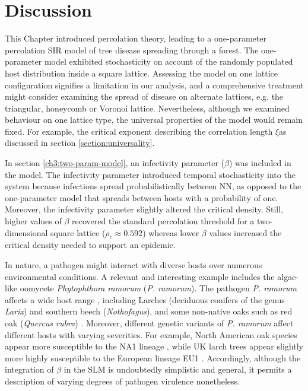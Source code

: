 \newpage

\section{Discussion}

This Chapter introduced percolation theory, leading to a one-parameter percolation SIR model of tree disease spreading through a forest.
The one-parameter model exhibited stochasticity on account of the randomly populated host distribution inside a square lattice. 
Assessing the model on one lattice configuration signifies a limitation in our analysis, and a comprehensive treatment might consider examining the spread of disease on alternate lattices, e.g. the triangular, honeycomb or Voronoi lattice. Nevertheless, although we examined behaviour on one lattice type, the universal properties of the model would remain fixed. For example, the critical exponent describing the correlation length $\xi$\textemdash as discussed in section \ref{section:universality}.

In section \ref{ch3:two-param-model}, an infectivity parameter ($\beta$) was included in the model.
The infectivity parameter introduced temporal stochasticity into the system because infections spread probabilistically between NN, as opposed to the one-parameter model that spreads between hosts with a probability of one.
Moreover, the infectivity parameter slightly altered the critical density.
Still, higher values of $\beta$ recovered the standard percolation threshold for a two-dimensional square lattice ($\rho_c\approx 0.592$) whereas lower $\beta$ values increased the critical density needed to support an epidemic.

In nature, a pathogen might interact with diverse hosts over numerous environmental conditions.
A relevant and interesting example includes the algae-like oomycete \textit{Phytophthora ramorum} (\textit{P. ramorum}). 
The pathogen \textit{P. ramorum} affects a wide host range \cite{GRUNWALD2012131}, 
including Larches (deciduous conifers of the genus \textit{Larix}) and southern beech (\textit{Nothofagus}), 
and some non-native oaks such as red oak (\textit{Quercus rubra}) \cite{grunwald2008phytophthora}.
Moreover, different genetic variants of \textit{P. ramorum} affect different hosts with varying severities.
For example, North American oak species appear more susceptible to the NA1 lineage \cite{rizzo2002phytophthora},  while UK larch trees appear slightly more highly susceptible to the European lineage EU1 \cite{king2015planta}. Accordingly, although the integration of $\beta$ in the SLM is undoubtedly simplistic and general, it permits a description of varying degrees of pathogen virulence nonetheless.

